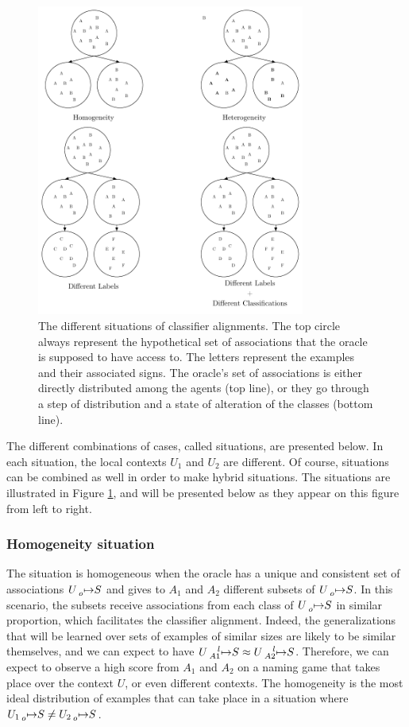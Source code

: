 \begin{figure}[t]
    \centering
    \includegraphics[width = 250pt]{figs/different_situations.pdf}
    \caption{The different situations of classifier alignments. The top circle always represent the hypothetical set of associations that the oracle is supposed to have access to. The letters represent the examples and their associated signs. The oracle's set of associations is either directly distributed among the agents (top line), or they go through a step of distribution and a state of alteration of the classes (bottom line).}
    \label{fig:classProblem}
\end{figure}

The different combinations of cases, called situations, are presented below. In each situation, the local contexts $U_{1}$ and $U_{2}$ are different. Of course, situations can be combined as well in order to make hybrid situations. The situations are illustrated in Figure \ref{fig:classProblem}, and will be presented below as they appear on this figure from left to right.

\subsubsection{Homogeneity situation} The situation is homogeneous when the oracle has a unique and consistent set of associations $U \prescript{}{o}{\mapsto} S$ and gives to $A_{1}$ and $A_{2}$ different subsets of $U \prescript{}{o}{\mapsto} S$. In this scenario, the subsets receive associations from each class of $U \prescript{}{o}{\mapsto} S$ in similar proportion, which facilitates the classifier alignment. Indeed, the generalizations that will be learned over sets of examples of similar sizes are likely to be similar themselves, and we can expect to have $U \prescript{l}{A1}{\mapsto} S \approx U \prescript{l}{A2}{\mapsto} S$. Therefore, we can expect to observe a high score from $A_{1}$ and $A_{2}$ on a naming game that takes place over the context $U$, or even different contexts. The homogeneity is the most ideal distribution of examples that can take place in a situation where $U_{1} \prescript{}{o}{\mapsto} S \neq U_{2} \prescript{}{o}{\mapsto} S$.


